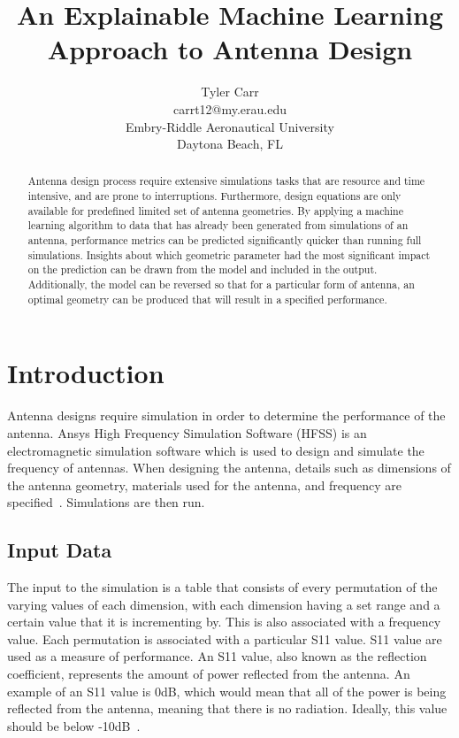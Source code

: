 \documentclass[lettersize,journal]{IEEEtran}
\begin{document}
\title{An Explainable Machine Learning Approach to Antenna Design}

\author{Tyler Carr \\ carrt12@my.erau.edu \\ Embry-Riddle Aeronautical University \\ Daytona Beach, FL}

\maketitle

\begin{abstract}
Antenna design process require extensive simulations tasks that are resource and time intensive, and are prone to interruptions. Furthermore, design equations are only available for predefined limited set of antenna geometries. By applying a machine learning algorithm to data that has already been generated from simulations of an antenna, performance metrics can be predicted significantly quicker than running full simulations. Insights about which geometric parameter had the most significant impact on the prediction can be drawn from the model and included in the output. Additionally, the model can be reversed so that for a particular form of antenna, an optimal geometry can be produced that will result in a specified performance. 
\end{abstract}

\section{Introduction}
Antenna designs require simulation in order to determine the performance of the antenna. Ansys High Frequency Simulation Software (HFSS) is an electromagnetic simulation software which is used to design and simulate the frequency of antennas. When designing the antenna, details such as dimensions of the antenna geometry, materials used for the antenna, and frequency are specified~\cite{Maxworth_2022}. Simulations are then run.


\subsection{Input Data}
The input to the simulation is a table that consists of every permutation of the varying values of each dimension, with each dimension having a set range and a certain value that it is incrementing by. This is also associated with a frequency value. Each permutation is associated with a particular S11 value. S11 value are used as a measure of performance. An S11 value, also known as the reflection coefficient, represents the amount of power reflected from the antenna. An example of an S11 value is 0dB, which would mean that all of the power is being reflected from the antenna, meaning that there is no radiation. Ideally, this value should be below -10dB~\cite{Bevelacqua_2015}. 
\end{document}
